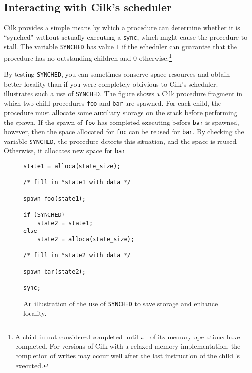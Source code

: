 \subsection{Interacting with Cilk's scheduler}
\label{sec:synched}

Cilk provides a simple means by which a procedure can determine
whether it is ``synched'' without actually executing a \texttt{sync},
which might cause the procedure to stall. The variable
\texttt{SYNCHED} has value $1$ if the scheduler can guarantee that the
procedure has no outstanding children and $0$ otherwise.\footnote{A
child in not considered completed until all of its memory operations
have completed.  For versions of Cilk with a relaxed memory
implementation, the completion of writes may occur well after the last
instruction of the child is executed.}

By testing \texttt{SYNCHED}, you can sometimes conserve space
resources and obtain better locality than if you were completely
oblivious to Cilk's scheduler.   illustrates such a
use of \texttt{SYNCHED}.  The figure shows a Cilk procedure fragment
in which two child procedures \texttt{foo} and \texttt{bar} are
spawned.  For each child, the procedure must allocate some auxiliary
storage on the stack before performing the spawn.  If the spawn of
\texttt{foo} has completed executing before \texttt{bar} is spawned,
however, then the space allocated for \texttt{foo} can be reused for
\texttt{bar}.  By checking the variable \texttt{SYNCHED}, the
procedure detects this situation, and the space is reused.  Otherwise,
it allocates new space for \texttt{bar}.

\begin{figure}[t]
\begin{center}
\begin{minipage}{.5\linewidth}
\small
\begin{verbatim}
state1 = alloca(state_size);

/* fill in *state1 with data */

spawn foo(state1);

if (SYNCHED)
    state2 = state1;
else
    state2 = alloca(state_size);

/* fill in *state2 with data */

spawn bar(state2);

sync;
\end{verbatim}
\end{minipage}
\end{center}
\caption{\small An illustration of the use of \texttt{SYNCHED} to save
storage and enhance locality.}
\label{fig:synched}
\end{figure}

